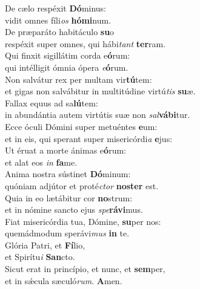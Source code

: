 \evenverse De cælo respéxit \textbf{Dó}minus:~\*\\
\evenverse vidit omnes fíli\textit{os} \textbf{hó}\textbf{mi}num.\\
\oddverse De præparáto habitáculo \textbf{su}o~\*\\
\oddverse respéxit super omnes, qui hábi\textit{tant} \textbf{ter}ram.\\
\evenverse Qui finxit sigillátim corda e\textbf{ó}rum:~\*\\
\evenverse qui intélligit ómnia ópera \textit{e}\textbf{ó}rum.\\
\oddverse Non salvátur rex per multam vir\textbf{tú}tem:~\*\\
\oddverse et gigas non salvábitur in multitúdine virtú\textit{tis} \textbf{su}æ.\\
\evenverse Fallax equus ad sa\textbf{lú}tem:~\*\\
\evenverse in abundántia autem virtútis suæ non \textit{sal}\textbf{vá}\textbf{bi}tur.\\
\oddverse Ecce óculi Dómini super metuéntes \textbf{e}um:~\*\\
\oddverse et in eis, qui sperant super misericórdi\textit{a} \textbf{e}jus:\\
\evenverse Ut éruat a morte ánimas e\textbf{ó}rum:~\*\\
\evenverse et alat eos \textit{in} \textbf{fa}me.\\
\oddverse Anima nostra sústinet \textbf{Dó}minum:~\*\\
\oddverse quóniam adjútor et proté\textit{ctor} \textbf{no}\textbf{ster} est.\\
\evenverse Quia in eo lætábitur cor \textbf{no}strum:~\*\\
\evenverse et in nómine sancto ejus \textit{spe}\textbf{rá}\textbf{vi}mus.\\
\oddverse Fiat misericórdia tua, Dómine, \textbf{su}per nos:~\*\\
\oddverse quemádmodum sperávi\textit{mus} \textbf{in} te.\\
\evenverse Glória Patri, et \textbf{Fí}lio,~\*\\
\evenverse et Spirítu\textit{i} \textbf{San}cto.\\
\oddverse Sicut erat in princípio, et nunc, et \textbf{sem}per,~\*\\
\oddverse et in sǽcula sæculó\textit{rum}. \textbf{A}men.\\
